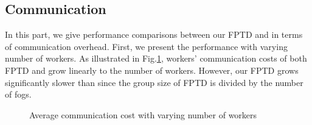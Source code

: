 \documentclass[conference,a4paper]{IEEEtran}
\begin{document}
    \subsection{Communication}
    In this part, we give performance comparisons between our FPTD and \cite{rtpt} in terms of communication overhead. First, we present the performance with varying number of workers. As illustrated in Fig.\ref{varying_worker_comm}, workers' communication costs of both FPTD and \cite{rtpt} grow linearly to the number of workers. However, our FPTD grows significantly slower than \cite{rtpt} since the group size of FPTD is divided by the number of fogs.
    \begin{figure}[!ht]
        \centering
        \caption{Average communication cost with varying number of workers}
        \label{varying_worker_comm}
    \end{figure}
\end{document}
